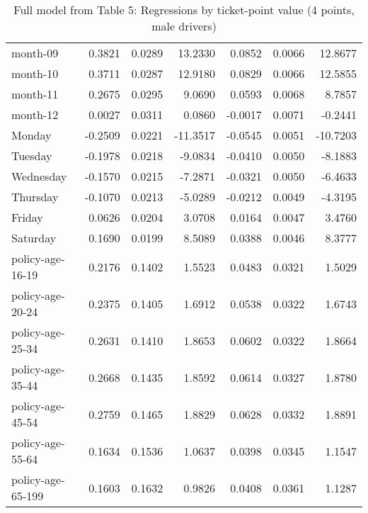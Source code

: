 \documentclass[10pt]{article}
\begin{document}
\begin{table}[ht]
\begin{tabular}{lrrrrrr}
  month-09 & 0.3821 & 0.0289 & 13.2330 & 0.0852 & 0.0066 & 12.8677 \\ 
  month-10 & 0.3711 & 0.0287 & 12.9180 & 0.0829 & 0.0066 & 12.5855 \\ 
  month-11 & 0.2675 & 0.0295 & 9.0690 & 0.0593 & 0.0068 & 8.7857 \\ 
  month-12 & 0.0027 & 0.0311 & 0.0860 & -0.0017 & 0.0071 & -0.2441 \\ 
  Monday & -0.2509 & 0.0221 & -11.3517 & -0.0545 & 0.0051 & -10.7203 \\ 
  Tuesday & -0.1978 & 0.0218 & -9.0834 & -0.0410 & 0.0050 & -8.1883 \\ 
  Wednesday & -0.1570 & 0.0215 & -7.2871 & -0.0321 & 0.0050 & -6.4633 \\ 
  Thursday & -0.1070 & 0.0213 & -5.0289 & -0.0212 & 0.0049 & -4.3195 \\ 
  Friday & 0.0626 & 0.0204 & 3.0708 & 0.0164 & 0.0047 & 3.4760 \\ 
  Saturday & 0.1690 & 0.0199 & 8.5089 & 0.0388 & 0.0046 & 8.3777 \\ 
  policy-age-16-19 & 0.2176 & 0.1402 & 1.5523 & 0.0483 & 0.0321 & 1.5029 \\ 
  policy-age-20-24 & 0.2375 & 0.1405 & 1.6912 & 0.0538 & 0.0322 & 1.6743 \\ 
  policy-age-25-34 & 0.2631 & 0.1410 & 1.8653 & 0.0602 & 0.0322 & 1.8664 \\ 
  policy-age-35-44 & 0.2668 & 0.1435 & 1.8592 & 0.0614 & 0.0327 & 1.8780 \\ 
  policy-age-45-54 & 0.2759 & 0.1465 & 1.8829 & 0.0628 & 0.0332 & 1.8891 \\ 
  policy-age-55-64 & 0.1634 & 0.1536 & 1.0637 & 0.0398 & 0.0345 & 1.1547 \\ 
  policy-age-65-199 & 0.1603 & 0.1632 & 0.9826 & 0.0408 & 0.0361 & 1.1287 \\ 
   \hline
\end{tabular}
\caption{Full model from Table 5: Regressions by ticket-point value (4 points, male drivers)} 
\label{tab_5_4_pts_M}
\end{table}


\clearpage
\pagebreak



\end{document}
